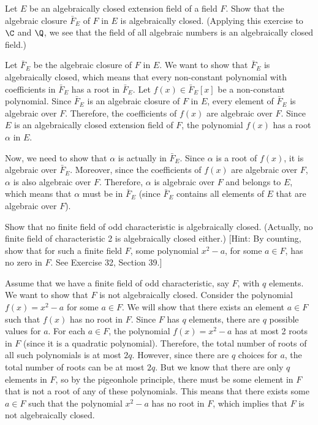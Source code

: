 
\begin{problem}[40.33]
  Let $E$ be an algebraically closed extension field of a field $F$. Show that the algebraic closure $\bar{F}_E$ of $F$ in $E$ is algebraically closed. (Applying this exercise to $\C$ and $\Q$, we see that the field of all algebraic numbers is an algebraically closed field.)
\end{problem}

\begin{solution}
  Let $\bar{F}_E$ be the algebraic closure of $F$ in $E$. We want to show that $\bar{F}_E$ is algebraically closed, which means that every non-constant polynomial with coefficients in $\bar{F}_E$ has a root in $\bar{F}_E$. Let $f(x) \in \bar{F}_E[x]$ be a non-constant polynomial. Since $\bar{F}_E$ is an algebraic closure of $F$ in $E$, every element of $\bar{F}_E$ is algebraic over $F$. Therefore, the coefficients of $f(x)$ are algebraic over $F$. Since $E$ is an algebraically closed extension field of $F$, the polynomial $f(x)$ has a root $\alpha$ in $E$.

  Now, we need to show that $\alpha$ is actually in $\bar{F}_E$. Since $\alpha$ is a root of $f(x)$, it is algebraic over $\bar{F}_E$. Moreover, since the coefficients of $f(x)$ are algebraic over $F$, $\alpha$ is also algebraic over $F$. Therefore, $\alpha$ is algebraic over $F$ and belongs to $E$, which means that $\alpha$ must be in $\bar{F}_E$ (since $\bar{F}_E$ contains all elements of $E$ that are algebraic over $F$).
\end{solution}

\begin{problem}[40.35]
  Show that no finite field of odd characteristic is algebraically closed. (Actually, no finite field of characteristic 2 is algebraically closed either.) [Hint: By counting, show that for such a finite field $F$, some polynomial $x^2 - a$, for some $a \in F$, has no zero in $F$. See Exercise 32, Section 39.]
\end{problem}

\begin{solution}
  Assume that we have a finite field of odd characteristic, say $F$, with $q$ elements. We want to show that $F$ is not algebraically closed. Consider the polynomial $f(x) = x^2 - a$ for some $a \in F$. We will show that there exists an element $a \in F$ such that $f(x)$ has no root in $F$. Since $F$ has $q$ elements, there are $q$ possible values for $a$. For each $a \in F$, the polynomial $f(x) = x^2 - a$ has at most 2 roots in $F$ (since it is a quadratic polynomial). Therefore, the total number of roots of all such polynomials is at most $2q$. However, since there are $q$ choices for $a$, the total number of roots can be at most $2q$. But we know that there are only $q$ elements in $F$, so by the pigeonhole principle, there must be some element in $F$ that is not a root of any of these polynomials. This means that there exists some $a \in F$ such that the polynomial $x^2 - a$ has no root in $F$, which implies that $F$ is not algebraically closed.
\end{solution}

